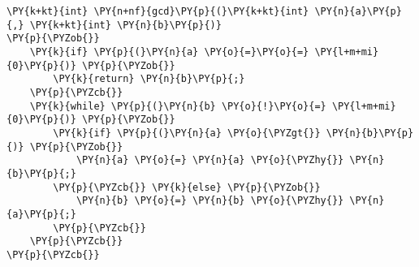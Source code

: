 \begin{Verbatim}[commandchars=\\\{\}]
\PY{k+kt}{int} \PY{n+nf}{gcd}\PY{p}{(}\PY{k+kt}{int} \PY{n}{a}\PY{p}{,} \PY{k+kt}{int} \PY{n}{b}\PY{p}{)}
\PY{p}{\PYZob{}}
    \PY{k}{if} \PY{p}{(}\PY{n}{a} \PY{o}{=}\PY{o}{=} \PY{l+m+mi}{0}\PY{p}{)} \PY{p}{\PYZob{}}
        \PY{k}{return} \PY{n}{b}\PY{p}{;}
    \PY{p}{\PYZcb{}}
    \PY{k}{while} \PY{p}{(}\PY{n}{b} \PY{o}{!}\PY{o}{=} \PY{l+m+mi}{0}\PY{p}{)} \PY{p}{\PYZob{}}
        \PY{k}{if} \PY{p}{(}\PY{n}{a} \PY{o}{\PYZgt{}} \PY{n}{b}\PY{p}{)} \PY{p}{\PYZob{}}
            \PY{n}{a} \PY{o}{=} \PY{n}{a} \PY{o}{\PYZhy{}} \PY{n}{b}\PY{p}{;}
        \PY{p}{\PYZcb{}} \PY{k}{else} \PY{p}{\PYZob{}}
            \PY{n}{b} \PY{o}{=} \PY{n}{b} \PY{o}{\PYZhy{}} \PY{n}{a}\PY{p}{;}
        \PY{p}{\PYZcb{}}
    \PY{p}{\PYZcb{}}
\PY{p}{\PYZcb{}}
\end{Verbatim}
